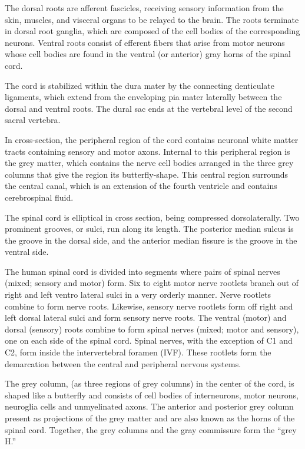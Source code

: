 \documentclass[]{book}
\begin{document}
The dorsal roots are afferent fascicles, receiving sensory information from the skin, muscles, and visceral organs to be relayed to the brain. The roots terminate in dorsal root ganglia, which are composed of the cell bodies of the corresponding neurons. Ventral roots consist of efferent fibers that arise from motor neurons whose cell bodies are found in the ventral (or anterior) gray horns of the spinal cord.

The cord is stabilized within the dura mater by the connecting denticulate ligaments, which extend from the enveloping pia mater laterally between the dorsal and ventral roots. The dural sac ends at the vertebral level of the second sacral vertebra.

In cross-section, the peripheral region of the cord contains neuronal white matter tracts containing sensory and motor axons. Internal to this peripheral region is the grey matter, which contains the nerve cell bodies arranged in the three grey columns that give the region its butterfly-shape. This central region surrounds the central canal, which is an extension of the fourth ventricle and contains cerebrospinal fluid.

The spinal cord is elliptical in cross section, being compressed dorsolaterally. Two prominent grooves, or sulci, run along its length. The posterior median sulcus is the groove in the dorsal side, and the anterior median fissure is the groove in the ventral side.

The human spinal cord is divided into segments where pairs of spinal nerves (mixed; sensory and motor) form. Six to eight motor nerve rootlets branch out of right and left ventro lateral sulci in a very orderly manner. Nerve rootlets combine to form nerve roots. Likewise, sensory nerve rootlets form off right and left dorsal lateral sulci and form sensory nerve roots. The ventral (motor) and dorsal (sensory) roots combine to form spinal nerves (mixed; motor and sensory), one on each side of the spinal cord. Spinal nerves, with the exception of C1 and C2, form inside the intervertebral foramen (IVF). These rootlets form the demarcation between the central and peripheral nervous systems.

The grey column, (as three regions of grey columns) in the center of the cord, is shaped like a butterfly and consists of cell bodies of interneurons, motor neurons, neuroglia cells and unmyelinated axons. The anterior and posterior grey column present as projections of the grey matter and are also known as the horns of the spinal cord. Together, the grey columns and the gray commissure form the ``grey H.''
\end{document}
